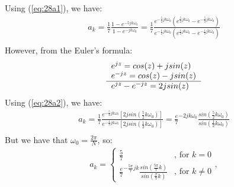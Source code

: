 \documentclass{article}
\begin{document}
\begin{enumerate}
            Using (\ref{eq:28a1}), we have:
            \begin{equation*}
                \begin{array}{l}
                    a_{k} = \frac{1}{7}\frac{1-e^{-5jk\omega_{0}}}{1-e^{-jk\omega_{0}}} = \frac{1}{7}\frac{e^{-\frac{5}{2}jk\omega_{0}}(e^{\frac{5}{2}jk\omega_{0}}-e^{-\frac{5}{2}jk\omega_{0}})}{e^{-\frac{1}{2}jk\omega_{0}}(e^{\frac{1}{2}jk\omega_{0}}-e^{-\frac{1}{2}jk\omega_{0}})}  \\
                \end{array}
            \end{equation*}
            However, from the Euler's formula:
            \begin{equation} \label{eq:28a2}
                \begin{tabular}{l}
                    $e^{jz} = cos(z) + jsin(z)$  \\
                    $e^{-jz} = cos(z) - jsin(z)$ \\
                    \hline
                    $e^{jz}-e^{-jz} = 2jsin(z)$
                \end{tabular}
            \end{equation}
            Using (\ref{eq:28a2}), we have:
            \begin{equation*}
                \begin{array}{l}
                    a_{k} =  \frac{1}{7}\frac{e^{-\frac{5}{2}jk\omega_{0}}[2jsin(\frac{5}{2}k\omega_{0})]}{e^{-\frac{1}{2}jk\omega_{0}}[2jsin(\frac{1}{2}k\omega_{0})]} = \frac{e}{7}^{-2jk\omega_{0}}\frac{sin(\frac{5}{2}k\omega_{0})}{sin(\frac{1}{2}k\omega_{0})}  \\
                \end{array}
            \end{equation*}
            But we have that $\omega_{0} = \frac{2\pi}{N}$, so:
            \begin{equation*}
                \begin{array}{l}
                    a_{k} = \left\{ \begin{array}{ll}
                    \frac{5}{7} &\textrm{, for } k = 0  \\
                    \frac{e}{7}^{-\frac{5\pi}{7}jk}\frac{sin(\frac{5\pi}{7}k)}{sin(\frac{\pi}{7}k)} &\textrm{, for } k \neq 0 
                    \end{array} \right.,   \\
                  

\end{array}
\end{equation*}
\end{enumerate}
\end{document}
